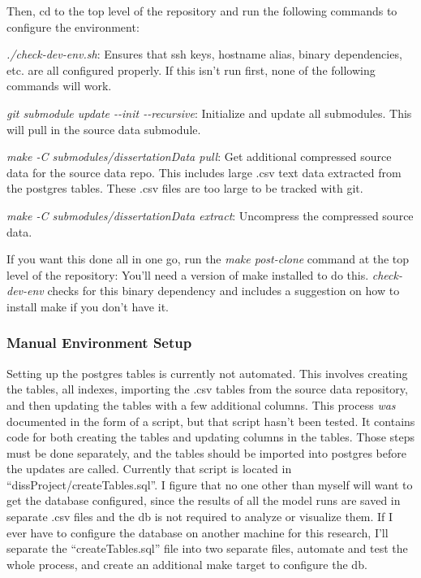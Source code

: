 \documentclass[man,floatsintext,donotrepeattitle]{apa6}
\begin{document}
Then, cd to the top level of the repository and run the following commands to configure the environment:

\begin{singlespace}
\begin{compactitem} 
  \item \emph{./check-dev-env.sh}:
    Ensures that ssh keys, hostname alias, binary dependencies, etc. are all configured properly.
    If this isn't run first, none of the following commands will work.
  \item \emph{git submodule update -{}-init -{}-recursive}:
    Initialize and update all submodules.
    This will pull in the source data submodule.
  \item \emph{make -C submodules/dissertationData pull}:
    Get additional compressed source data for the source data repo.
    This includes large .csv text data extracted from the postgres tables.
    These .csv files are too large to be tracked with git.
  \item \emph{make -C submodules/dissertationData extract}:
    Uncompress the compressed source data.
\end{compactitem}
\end{singlespace}

If you want this done all in one go, run the \emph{make post-clone} command at the top level of the repository:
You'll need a version of make installed to do this.
\emph{check-dev-env} checks for this binary dependency and includes a suggestion on how to install make if you don't have it.

\subsubsection{Manual Environment Setup}

Setting up the postgres tables is currently not automated.
This involves creating the tables, all indexes, importing the .csv tables from the source data repository, and then updating the tables with a few additional columns.
This process \emph{was} documented in the form of a script, but that script hasn't been tested.
It contains code for both creating the tables and updating columns in the tables.
Those steps must be done separately, and the tables should be imported into postgres before the updates are called.
Currently that script is located in ``dissProject/createTables.sql''.
I figure that no one other than myself will want to get the database configured,
since the results of all the model runs are saved in separate .csv files and the db is not required to analyze or visualize them.
If I ever have to configure the database on another machine for this research, I'll separate the ``createTables.sql'' file into two separate files, 
automate and test the whole process, and create an additional make target to configure the db.

\printbibliography[heading=bibintoc]
\end{document}
